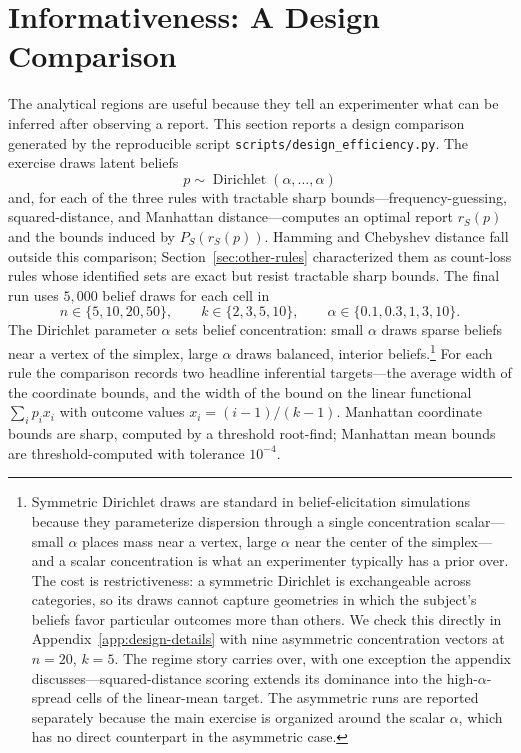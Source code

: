 \section{Informativeness: A Design Comparison}\label{sec:design}

The analytical regions are useful because they tell an experimenter what can be inferred after observing a report.
This section reports a design comparison generated by the reproducible script \texttt{scripts/design\_efficiency.py}.
The exercise draws latent beliefs
\[
p\sim\operatorname{Dirichlet}(\alpha,\ldots,\alpha)
\]
and, for each of the three rules with tractable sharp bounds---frequency-guessing, squared-distance, and Manhattan distance---computes an optimal report \(r_S(p)\) and the bounds induced by \(P_S(r_S(p))\).
Hamming and Chebyshev distance fall outside this comparison; Section~\ref{sec:other-rules} characterized them as count-loss rules whose identified sets are exact but resist tractable sharp bounds.
The final run uses \(5{,}000\) belief draws for each cell in
\[
n\in\{5,10,20,50\},\qquad
k\in\{2,3,5,10\},\qquad
\alpha\in\{0.1,0.3,1,3,10\}.
\]
The Dirichlet parameter \(\alpha\) sets belief concentration: small \(\alpha\) draws sparse beliefs near a vertex of the simplex, large \(\alpha\) draws balanced, interior beliefs.\footnote{Symmetric Dirichlet draws are standard in belief-elicitation simulations because they parameterize dispersion through a single concentration scalar---small \(\alpha\) places mass near a vertex, large \(\alpha\) near the center of the simplex---and a scalar concentration is what an experimenter typically has a prior over. The cost is restrictiveness: a symmetric Dirichlet is exchangeable across categories, so its draws cannot capture geometries in which the subject's beliefs favor particular outcomes more than others. We check this directly in Appendix~\ref{app:design-details} with nine asymmetric concentration vectors at \(n=20\), \(k=5\). The regime story carries over, with one exception the appendix discusses---squared-distance scoring extends its dominance into the high-\(\alpha\)-spread cells of the linear-mean target. The asymmetric runs are reported separately because the main exercise is organized around the scalar \(\alpha\), which has no direct counterpart in the asymmetric case.}
For each rule the comparison records two headline inferential targets---the average width of the coordinate bounds, and the width of the bound on the linear functional \(\sum_i p_i x_i\) with outcome values \(x_i=(i-1)/(k-1)\).
Manhattan coordinate bounds are sharp, computed by a threshold root-find; Manhattan mean bounds are threshold-computed with tolerance \(10^{-4}\).

